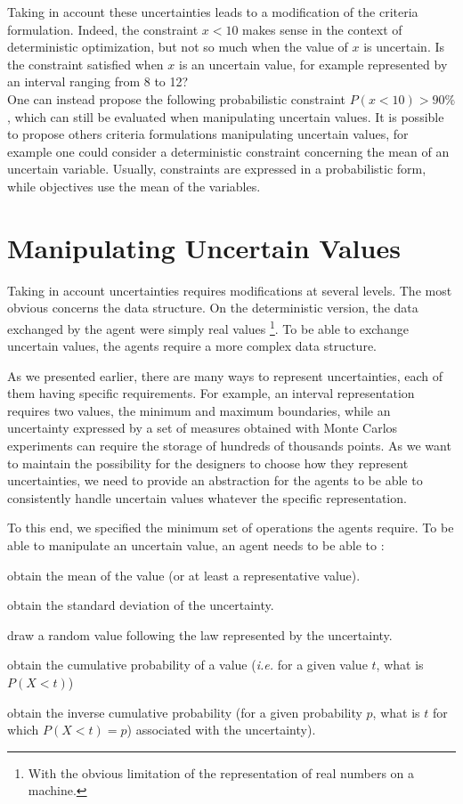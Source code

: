Taking in account these uncertainties leads to a modification of the criteria formulation. Indeed, the constraint $x < 10$ makes sense in the context of deterministic optimization, but not so much when the value of $x$ is uncertain. Is the constraint satisfied when $x$ is an uncertain value, for example represented by an interval ranging from 8 to 12?\\
One can instead propose the following probabilistic constraint $P(x < 10) > 90\%$, which can still be evaluated when manipulating uncertain values. It is possible to propose others criteria formulations manipulating uncertain values, for example one could consider a deterministic constraint concerning the mean of an uncertain variable. Usually, constraints are expressed in a probabilistic form, while objectives use the mean of the variables.

\section{Manipulating Uncertain Values}

Taking in account uncertainties requires modifications at several levels. The most obvious concerns the data structure. On the deterministic version, the data exchanged by the agent were simply real values \footnote{With the obvious limitation of the representation of real numbers on a machine.}. To be able to exchange uncertain values, the agents require a more complex data structure.

As we presented earlier, there are many ways to represent uncertainties, each of them having specific requirements. For example, an interval representation requires two values, the minimum and maximum boundaries, while an uncertainty expressed by a set of measures obtained with Monte Carlos experiments can require the storage of hundreds of thousands points. As we want to maintain the possibility for the designers to choose how they represent uncertainties, we need to provide an abstraction for the agents to be able to consistently handle uncertain values whatever the specific representation.

To this end, we specified the minimum set of operations the agents require. To be able to manipulate an uncertain value, an agent needs to be able to :
\begin{compactitem}
\item obtain the mean of the value (or at least a representative value).
\item obtain the standard deviation of the uncertainty.
\item draw a random value following the law represented by the uncertainty.
\item obtain the cumulative probability of a value (\emph{i.e.} for a given value $t$, what is $P(X < t)$) 
\item obtain the inverse cumulative probability (for a given probability $p$, what is $t$ for which $P(X < t) = p$) associated with the uncertainty).
\end{compactitem}

